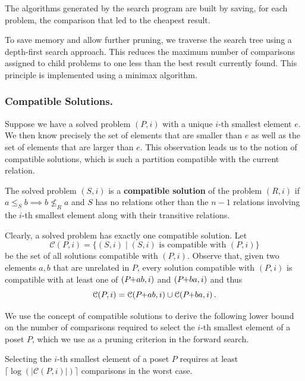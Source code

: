 \documentclass[a4paper,UKenglish,cleveref, autoref, thm-restate, anonymous]{lipics-v2021}
\newcommand{\pchild}[3]{{#1}\kern-1pt{+}{#2}{#3}}
\begin{document}
The algorithms generated by the search program are built by saving, for each problem, the comparison that led to the cheapest result.

To save memory and allow further pruning, we traverse the search tree using a depth-first search approach.
This reduces the maximum number of comparisons assigned to child problems to one less than the best result currently found.
This principle is implemented using a minimax algorithm.

\subsubsection{Compatible Solutions.}
Suppose we have a solved problem $(P, i)$ with a unique $i$-th smallest element $e$.
We then know precisely the set of elements that are smaller than $e$ as well as the set of elements that are larger than $e$.
This observation leads us to the notion of compatible solutions, which is such a partition compatible with the current relation.

\begin{definition}
  The solved problem $(S, i)$ is a \textbf{compatible solution} of the problem $(R, i)$ if $a \le_S b \implies b \not\le_R a$ and $S$ has no relations other than the $n - 1$ relations involving the $i$-th smallest element along with their transitive relations.
\end{definition}

Clearly, a solved problem has exactly one compatible solution.
Let
\begin{equation*}
  \mathcal{C}(P, i) = \{(S, i) \mid (S, i) \text{ is compatible with } (P, i)\}
\end{equation*}
be the set of all solutions compatible with $(P, i)$.
Observe that, given two elements $a,b$ that are unrelated in $P$, every solution compatible with $(P, i)$ is compatible with at least one of $(\pchild{P}{a}{b}, i)$ and $(\pchild{P}{b}{a}, i)$ and thus
\begin{equation}\label{lemma:compatible_union}
  \mathcal{C}(P, i) = \mathcal{C}(\pchild{P}{a}{b}, i) \cup \mathcal{C}(\pchild{P}{b}{a}, i)\,\text{.}
\end{equation}

We use the concept of compatible solutions to derive the following lower bound on the number of comparisons required to select the $i$-th smallest element of a poset $P$, which we use as a pruning criterion in the forward search.

\begin{theorem}\label{theorem:compatible_log}
  Selecting the $i$-th smallest element of a poset $P$ requires at least $\lceil\log(|\mathcal{C}(P, i)|)\rceil$ comparisons in the worst case.
\end{theorem}
\end{document}
